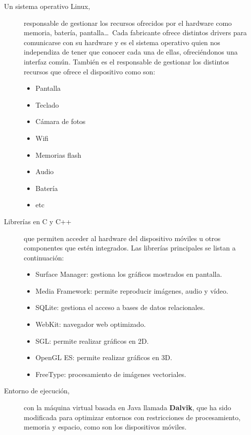 \begin{description}
\item [Un sistema operativo Linux,] responsable de gestionar los recursos ofrecidos por el hardware como memoria, batería, pantalla\ldots\ Cada fabricante ofrece distintos drivers para comunicarse con su hardware y es el sistema operativo quien nos independiza de tener que conocer cada una de ellas, 
ofreciéndonos una interfaz común. También es el responsable de gestionar los distintos recursos que ofrece el dispositivo como son:
\begin{multicols}{2}
\begin{itemize}
\item Pantalla
\item Teclado
\item Cámara de fotos
\item Wifi
\end{itemize}
\begin{itemize}
\item Memorias flash
\item Audio 
\item Batería
\item etc
\end{itemize}
\end{multicols}

\item [Librerías en C y C++] que permiten acceder al hardware del dispositivo móviles u otros componentes que estén integrados. Las librerías principales se listan a continuación:
\begin{itemize}
\item Surface Manager: gestiona los gráficos mostrados en pantalla.
\item Media Framework: permite reproducir imágenes, audio y vídeo. 
\item SQLite: gestiona el acceso a bases de datos relacionales. 
\item WebKit: navegador web optimizado.  
\item SGL: permite realizar gráficos en 2D.  
\item OpenGL ES: permite realizar gráficos en 3D.
\item FreeType: procesamiento de imágenes vectoriales.
\end{itemize}

\item [Entorno de ejecución,] con la máquina virtual basada en Java llamada \textbf{Dalvik}, que ha sido modificada para optimizar entornos con restricciones de procesamiento, memoria y espacio, como son los dispositivos móviles. 


\end{description}
